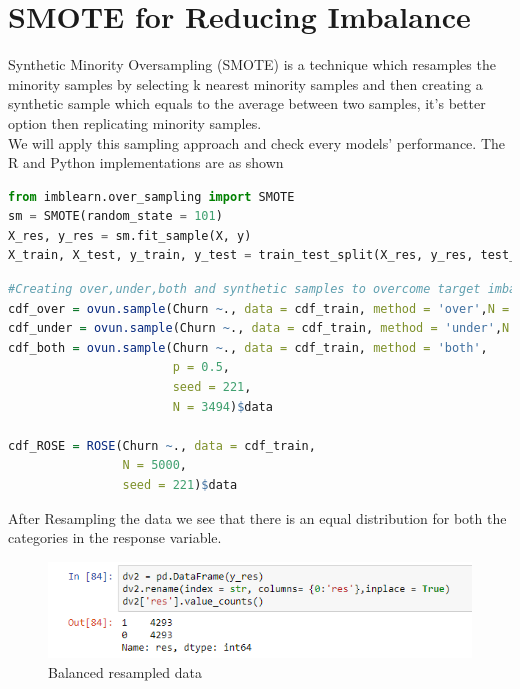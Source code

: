 \documentclass[a4paper,12pt]{report}
\begin{document}
\section{SMOTE for Reducing Imbalance}
Synthetic Minority Oversampling (SMOTE) is a technique which resamples the minority samples by selecting k nearest minority samples  and then creating a synthetic sample which equals to the average between two samples,  it's better option then replicating minority samples.\\
We will apply this sampling approach and check every models' performance. The R and Python implementations are as shown
\begin{lstlisting}[language=Python, caption=Python SMOTE Implementation]
from imblearn.over_sampling import SMOTE
sm = SMOTE(random_state = 101)
X_res, y_res = sm.fit_sample(X, y)
X_train, X_test, y_train, y_test = train_test_split(X_res, y_res, test_size=0.3, random_state=101) 
\end{lstlisting}
\FloatBarrier
\begin{lstlisting}[language=R, caption=R resampling]
#Creating over,under,both and synthetic samples to overcome target imbalance
cdf_over = ovun.sample(Churn ~., data = cdf_train, method = 'over',N = 5984)$data
cdf_under = ovun.sample(Churn ~., data = cdf_train, method = 'under',N = 1004)$data
cdf_both = ovun.sample(Churn ~., data = cdf_train, method = 'both',
                       p = 0.5,
                       seed = 221,
                       N = 3494)$data

cdf_ROSE = ROSE(Churn ~., data = cdf_train,
                N = 5000,
                seed = 221)$data
\end{lstlisting}
After Resampling the data we see that there is an equal distribution for both the categories in the response variable.
\begin{figure}[h]
\vspace{5pt}
\centering
\includegraphics[scale = 0.7]{balanced.PNG}
\caption{Balanced resampled data}
\label{fig:3.5}
\end{figure}
\FloatBarrier
\end{document}
